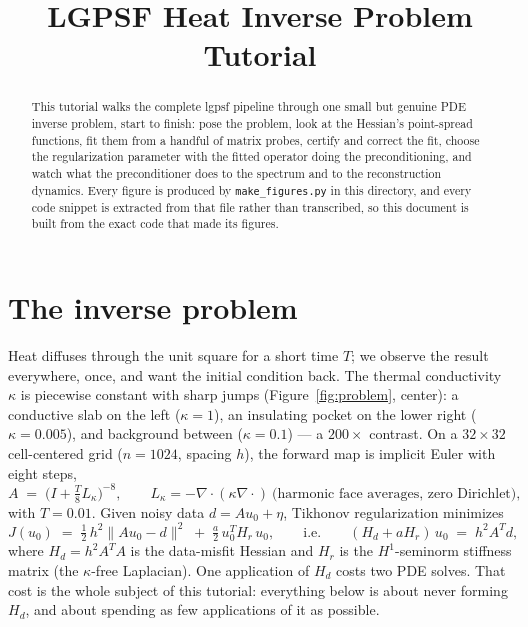 \documentclass[11pt]{article}
\title{LGPSF Heat Inverse Problem Tutorial}
\author{}
\date{}
\newcommand{\Hd}{H_d}
\newcommand{\Hr}{H_r}
\begin{document}
\maketitle
\vspace{-3em}

\begin{abstract}
\noindent
This tutorial walks the complete lgpsf pipeline through one small but
genuine PDE inverse problem, start to finish: pose the problem, look at
the Hessian's point-spread functions, fit them from a handful of matrix
probes, certify and correct the fit, choose the regularization parameter
with the fitted operator doing the preconditioning, and watch what the
preconditioner does to the spectrum and to the reconstruction dynamics.
Every figure is produced by \texttt{make\_figures.py} in this directory,
and every code snippet is extracted from that file rather than
transcribed, so this document is built from the exact code that made its
figures.
\end{abstract}

\section{The inverse problem}

Heat diffuses through the unit square for a short time $T$; we observe
the result everywhere, once, and want the initial condition back. The
thermal conductivity $\kappa$ is piecewise constant with sharp jumps
(Figure~\ref{fig:problem}, center): a conductive slab on the left
($\kappa = 1$), an insulating pocket on the lower right
($\kappa = 0.005$), and background between ($\kappa = 0.1$) --- a
$200\times$ contrast. On a $32 \times 32$ cell-centered grid
($n = 1024$, spacing $h$), the forward map is implicit Euler with eight
steps,
\[
  A \;=\; \bigl(I + \tfrac{T}{8} L_\kappa\bigr)^{-8},
  \qquad
  L_\kappa = -\nabla\!\cdot\!(\kappa \nabla \cdot)
  \ \text{(harmonic face averages, zero Dirichlet)},
\]
with $T = 0.01$. Given noisy data $d = A u_0 + \eta$, Tikhonov
regularization minimizes
\[
  J(u_0) \;=\; \tfrac{1}{2}\, h^2 \|A u_0 - d\|^2
  \;+\; \tfrac{a}{2}\, u_0^T \Hr\, u_0 ,
  \qquad\text{i.e.}\qquad
  (\Hd + a \Hr)\, u_0 \;=\; h^2 A^T d,
\]
where $\Hd = h^2 A^T A$ is the data-misfit Hessian and $\Hr$ is the
$H^1$-seminorm stiffness matrix (the $\kappa$-free Laplacian). One
application of $\Hd$ costs two PDE solves. That cost is the whole
subject of this tutorial: everything below is about never forming
$\Hd$, and about spending as few applications of it as possible.
\end{document}
